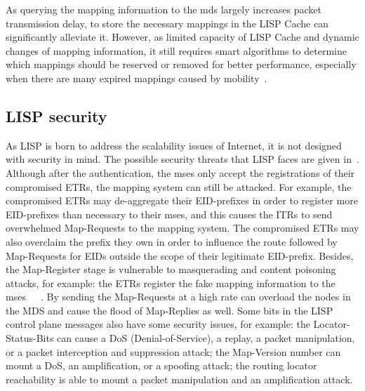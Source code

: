 As querying the mapping information to the \acrshort{mds} largely increases packet transmission delay, to store the necessary mappings in the LISP Cache can significantly alleviate it. However, as limited capacity of LISP Cache and dynamic changes of mapping information, it still requires smart algorithms to determine which mappings should be reserved or removed for better performance, especially when there are many expired mappings caused by mobility~\cite{feng2017locator}.


\subsection{LISP security}
\label{subsec:security}

As LISP is born to address the scalability issues of Internet, it is not designed with security in mind. The possible security threats that LISP faces are given in~\cite{rfc7835}. Although after the authentication, the \acrshort{ms}es only accept the registrations of their compromised ETRs, the mapping system can still be attacked. For example, the compromised ETRs may de-aggregate their EID-prefixes in order to register more EID-prefixes than necessary to their \acrshort{ms}es, and this causes the ITRs to send overwhelmed Map-Requests to the mapping system. The compromised ETRs may also overclaim the prefix they own in order to influence the route followed by Map-Requests for EIDs outside the scope of their legitimate EID-prefix. Besides, the Map-Register stage is vulnerable to masquerading and content poisoning attacks, for example: the ETRs register the fake mapping information to the \acrshort{ms}es~\cite{aiash2013securing}~\cite{montero2013securing}~\cite{aiash2013novel}. By sending the Map-Requests at a high rate can overload the nodes in the MDS and cause the flood of Map-Replies as well. Some bits in the LISP control plane messages also have some security issues, for example: the Locator-Status-Bits can cause a DoS (Denial-of-Service), a replay, a packet manipulation, or a packet interception and suppression attack; the Map-Version number can mount a DoS, an amplification, or a spoofing attack; the routing locator reachability is able to mount a packet manipulation and an amplification attack.


